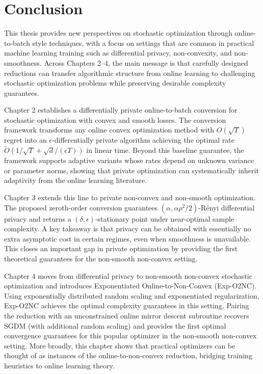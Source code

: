 \chapter{Conclusion}
\label{chapter:conclusion}
\thispagestyle{myheadings}

This thesis provides new perspectives on stochastic optimization through online-to-batch style techniques, with a focus on settings that are common in practical machine learning training such as differential privacy, non-convexity, and non-smoothness. Across Chapters 2--4, the main message is that carefully designed reductions can transfer algorithmic structure from online learning to challenging stochastic optimization problems while preserving desirable complexity guarantees.

Chapter 2 establishes a differentially private online-to-batch conversion for stochastic optimization with convex and smooth losses. The conversion framework transforms any online convex optimization method with $O(\sqrt{T})$ regret into an $\epsilon$-differentially private algorithm achieving the optimal rate $\tilde O(1/\sqrt{T} + \sqrt{d}/(\epsilon T))$ in linear time. Beyond this baseline guarantee, the framework supports adaptive variants whose rates depend on unknown variance or parameter norms, showing that private optimization can systematically inherit adaptivity from the online learning literature.

Chapter 3 extends this line to private non-convex and non-smooth optimization. The proposed zeroth-order conversion guarantees $(\alpha,\alpha\rho^2/2)$-R\'enyi differential privacy and returns a $(\delta,\epsilon)$-stationary point under near-optimal sample complexity. A key takeaway is that privacy can be obtained with essentially no extra asymptotic cost in certain regimes, even when smoothness is unavailable. This closes an important gap in private optimization by providing the first theoretical guarantees for the non-smooth non-convex setting.

Chapter 4 moves from differential privacy to non-smooth non-convex stochastic optimization and introduces Exponentiated Online-to-Non-Convex (Exp-O2NC). Using exponentially distributed random scaling and exponentiated regularization, Exp-O2NC achieves the optimal complexity guarantees in this setting. Pairing the reduction with an unconstrained online mirror descent subroutine recovers SGDM (with additional random scaling) and provides the first optimal convergence guarantees for this popular optimizer in the non-smooth non-convex setting. More broadly, this chapter shows that practical optimizers can be thought of as instances of the online-to-non-convex reduction, bridging training heuristics to online learning theory.

